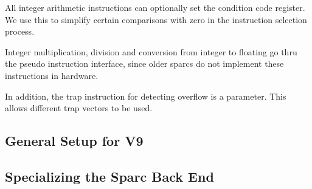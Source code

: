  All integer arithmetic instructions can optionally set the condition
 code register.  We use this to simplify certain comparisons with zero
 in the instruction selection process.

 Integer multiplication, division and conversion from integer to floating
 go thru the pseudo instruction interface, since older sparcs do not
 implement these instructions in hardware.

 In addition, the trap instruction for detecting overflow is a parameter.
 This allows different trap vectors to be used.

\subsection{General Setup for V9}

\subsection{Specializing the Sparc Back End}
